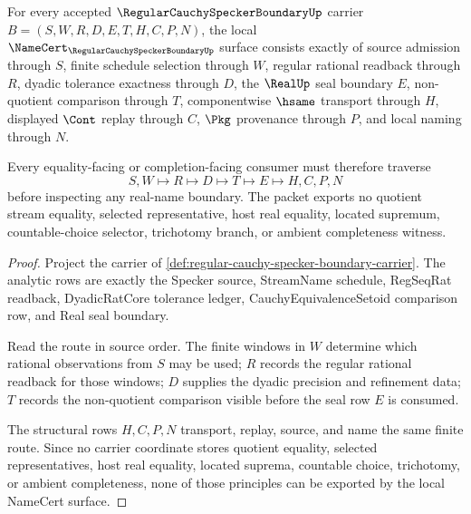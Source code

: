 \begin{theorem}
\label{thm:regular-cauchy-specker-boundary-namecert-obligations}
For every accepted $\RegularCauchySpeckerBoundaryUp$ carrier $B=(S,W,R,D,E,T,H,C,P,N)$, the local $\NameCert_{\RegularCauchySpeckerBoundaryUp}$ surface consists exactly of source admission through $S$, finite schedule selection through $W$, regular rational readback through $R$, dyadic tolerance exactness through $D$, the $\RealUp$ seal boundary $E$, non-quotient comparison through $T$, componentwise $\hsame$ transport through $H$, displayed $\Cont$ replay through $C$, $\Pkg$ provenance through $P$, and local naming through $N$.

Every equality-facing or completion-facing consumer must therefore traverse
$$
S,W \longmapsto R \longmapsto D \longmapsto T \longmapsto E \longmapsto H,C,P,N
$$
before inspecting any real-name boundary. The packet exports no quotient stream equality, selected representative, host real equality, located supremum, countable-choice selector, trichotomy branch, or ambient completeness witness.
\end{theorem}
\begin{proof}
Project the carrier of \autoref{def:regular-cauchy-specker-boundary-carrier}. The analytic rows are exactly the Specker source, StreamName schedule, RegSeqRat readback, DyadicRatCore tolerance ledger, CauchyEquivalenceSetoid comparison row, and Real seal boundary.

Read the route in source order. The finite windows in $W$ determine which rational observations from $S$ may be used; $R$ records the regular rational readback for those windows; $D$ supplies the dyadic precision and refinement data; $T$ records the non-quotient comparison visible before the seal row $E$ is consumed.

The structural rows $H,C,P,N$ transport, replay, source, and name the same finite route. Since no carrier coordinate stores quotient equality, selected representatives, host real equality, located suprema, countable choice, trichotomy, or ambient completeness, none of those principles can be exported by the local NameCert surface.
\end{proof}


